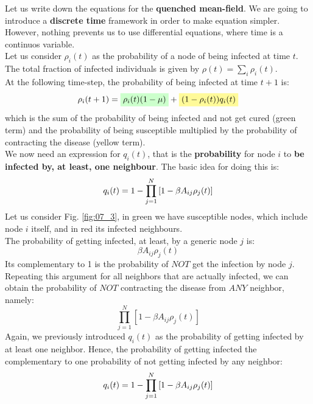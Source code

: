 \documentclass[../main/main.tex]{subfiles}
\begin{document}
Let us write down the equations for the \textbf{quenched mean-field}. We are going to introduce a \textbf{discrete time} framework in order to make equation simpler. However, nothing prevents us to use differential equations, where time is a continuos variable.\\
Let us consider \( \rho _i (t) \) as the probability of a node of being infected at time \( t \). The total fraction of infected individuals is given by \( \rho (t) = \sum_{i}^{} \rho _i (t)   \).\\
At the following time-step, the probability of being infected at time \( t+1 \) is:
\begin{equation}
  \rho _i (t+1) = \mathcolorbox{green!20}{\rho _i(t) (1- \mu )} + \mathcolorbox{yellow!40}{(1 - \rho _i(t))q_i(t)}
\end{equation}
which is the sum of the probability of being infected and not get cured (green term) and the probability of being susceptible multiplied by the probability of contracting the disease (yellow term).\\
We now need an expression for \( q_i(t) \), that is the \textbf{probability} for node \( i \) to \textbf{be infected by, at least, one neighbour}. The basic idea for doing this is:
\begin{equation}
  q_i (t) = 1 - \prod_{j=1}^{N} \qty[1- \beta A_{ij} \rho _j (t)]
\end{equation}
Let us consider Fig. \ref{fig:07_3}, in green we have susceptible nodes, which include node \( i \) itself, and in red its infected neighbours.\\
The probability of getting infected, at least, by a generic node $j$ is:
\begin{equation}
   \beta A_{ij} \rho _j (t) 
\end{equation}
Its complementary to 1 is the probability of $NOT$ get the infection by node $j$.  
\begin{equation}
   [1- \beta A_{ij} \rho _j (t)] 
\end{equation}
Repeating this argument for all neighbors that are actually infected, we can obtain the probability of $NOT$ contracting the disease from $ANY$ neighbor, namely:
\begin{equation}
    \prod_{j=1}^{N} [1- \beta A_{ij} \rho _j (t)]
\end{equation}
Again, we previously introduced \(   q_i (t) \) as the probability of getting infected by at least one neighbor. Hence, the probability of getting infected the complementary to one probability of not getting infected by any neighbor:
\begin{equation}
  q_i (t) = 1 - \prod_{j=1}^{N} \qty[1- \beta A_{ij} \rho _j (t)]
\end{equation}
\end{document}
